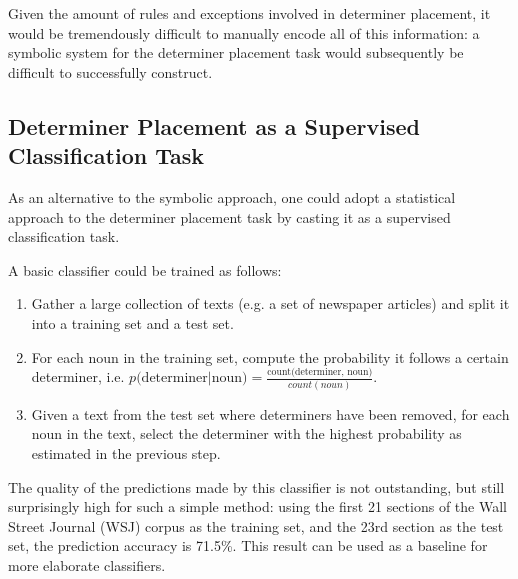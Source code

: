 \documentclass[justified, marginals=justified]{tufte-handout}
\begin{document}
Given the amount of rules and exceptions involved in determiner placement, it would be tremendously difficult to manually encode all of this information: a symbolic system for the determiner placement task would subsequently be difficult to successfully construct.

\subsection{Determiner Placement as a Supervised Classification Task}\label{sec:determiner-prediction-as-classification}

As an alternative to the symbolic approach, one could adopt a statistical approach to the determiner placement task by casting it as a supervised classification task. %

\medskip

A basic classifier could be trained as follows:

\begin{enumerate}
\item Gather a large collection of texts (e.g. a set of newspaper articles) and split it into a training set and a test set.
\item For each noun in the training set, compute the probability it follows a certain determiner, i.e. $p(\text{determiner}| \text{noun)} = \frac{\text{count(determiner, noun)}}{count(noun)} $.
\item Given a text from the test set where determiners have been removed, for each noun in the text, select the determiner with the highest probability as estimated in the previous step.
\end{enumerate}

The quality of the predictions made by this classifier is not outstanding, but still surprisingly high for such a simple method: using the first 21 sections of the Wall Street Journal (WSJ) corpus as the training set, and the 23rd section as the test set, the prediction accuracy is 71.5\%. This result can be used as a baseline for more elaborate classifiers.
\end{document}
